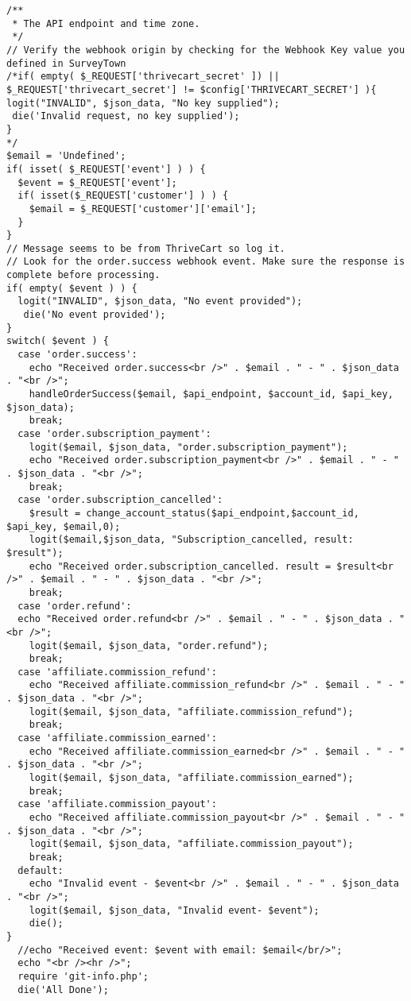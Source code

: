 \documentclass[final,letterpaper,12pt]{article}
\begin{document}
\begin{appendices}
\begin{verbatim}
/**
 * The API endpoint and time zone.
 */
// Verify the webhook origin by checking for the Webhook Key value you defined in SurveyTown
/*if( empty( $_REQUEST['thrivecart_secret' ]) || $_REQUEST['thrivecart_secret'] != $config['THRIVECART_SECRET'] ){
logit("INVALID", $json_data, "No key supplied");
 die('Invalid request, no key supplied');
}
*/
$email = 'Undefined';
if( isset( $_REQUEST['event'] ) ) {
  $event = $_REQUEST['event'];
  if( isset($_REQUEST['customer'] ) ) {
    $email = $_REQUEST['customer']['email'];
  }
}
// Message seems to be from ThriveCart so log it.
// Look for the order.success webhook event. Make sure the response is complete before processing.
if( empty( $event ) ) {
  logit("INVALID", $json_data, "No event provided");
   die('No event provided');
}
switch( $event ) {
  case 'order.success':
    echo "Received order.success<br />" . $email . " - " . $json_data . "<br />";
    handleOrderSuccess($email, $api_endpoint, $account_id, $api_key, $json_data);
    break;
  case 'order.subscription_payment':
    logit($email, $json_data, "order.subscription_payment");
    echo "Received order.subscription_payment<br />" . $email . " - " . $json_data . "<br />";
    break;
  case 'order.subscription_cancelled':
    $result = change_account_status($api_endpoint,$account_id, $api_key, $email,0);
    logit($email,$json_data, "Subscription_cancelled, result: $result");
    echo "Received order.subscription_cancelled. result = $result<br />" . $email . " - " . $json_data . "<br />";
    break;
  case 'order.refund':
  echo "Received order.refund<br />" . $email . " - " . $json_data . "<br />";
    logit($email, $json_data, "order.refund");
    break;
  case 'affiliate.commission_refund':
    echo "Received affiliate.commission_refund<br />" . $email . " - " . $json_data . "<br />";
    logit($email, $json_data, "affiliate.commission_refund");
    break;
  case 'affiliate.commission_earned':
    echo "Received affiliate.commission_earned<br />" . $email . " - " . $json_data . "<br />";
    logit($email, $json_data, "affiliate.commission_earned");
    break;
  case 'affiliate.commission_payout':
    echo "Received affiliate.commission_payout<br />" . $email . " - " . $json_data . "<br />";
    logit($email, $json_data, "affiliate.commission_payout");
    break;
  default:
    echo "Invalid event - $event<br />" . $email . " - " . $json_data . "<br />";
    logit($email, $json_data, "Invalid event- $event");
    die();
}
  //echo "Received event: $event with email: $email</br/>";
  echo "<br /><hr />";
  require 'git-info.php';
  die('All Done');




\end{verbatim}
\end{appendices}
\end{document}
